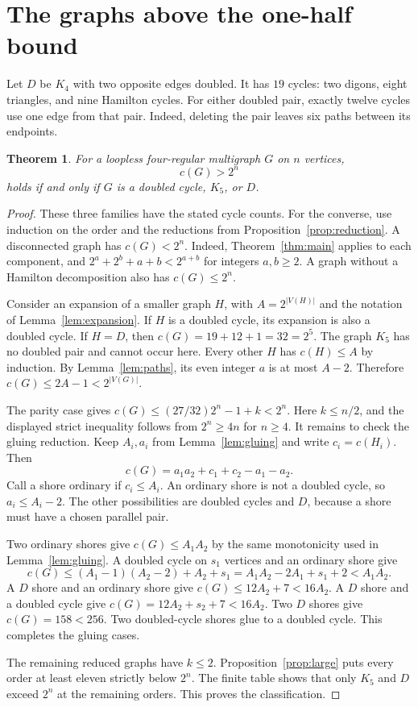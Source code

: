 \documentclass[11pt]{article}
\newtheorem{theorem}{Theorem}
\begin{document}
\section{The graphs above the one-half bound}

Let $D$ be $K_4$ with two opposite edges doubled.
It has $19$ cycles: two digons, eight triangles, and nine Hamilton cycles.
For either doubled pair, exactly twelve cycles use one edge from that pair.
Indeed, deleting the pair leaves six paths between its endpoints.

\begin{theorem}\label{thm:above-half}
For a loopless four-regular multigraph $G$ on $n$ vertices,
\[
 c(G)>2^n
\]
holds if and only if $G$ is a doubled cycle, $K_5$, or $D$.
\end{theorem}

\begin{proof}
These three families have the stated cycle counts.
For the converse, use induction on the order and the reductions from Proposition~\ref{prop:reduction}.
A disconnected graph has $c(G)<2^n$.
Indeed, Theorem~\ref{thm:main} applies to each component, and
$2^a+2^b+a+b<2^{a+b}$ for integers $a,b\ge2$.
A graph without a Hamilton decomposition also has $c(G)\le2^n$.

Consider an expansion of a smaller graph $H$, with $A=2^{|V(H)|}$ and the notation of Lemma~\ref{lem:expansion}.
If $H$ is a doubled cycle, its expansion is also a doubled cycle.
If $H=D$, then $c(G)=19+12+1=32=2^5$.
The graph $K_5$ has no doubled pair and cannot occur here.
Every other $H$ has $c(H)\le A$ by induction.
By Lemma~\ref{lem:paths}, its even integer $a$ is at most $A-2$.
Therefore $c(G)\le2A-1<2^{|V(G)|}$.

The parity case gives $c(G)\le(27/32)2^n-1+k<2^n$.
Here $k\le n/2$, and the displayed strict inequality follows from $2^n\ge4n$ for $n\ge4$.
It remains to check the gluing reduction.
Keep $A_i,a_i$ from Lemma~\ref{lem:gluing} and write $c_i=c(H_i)$.
Then
\[
 c(G)=a_1a_2+c_1+c_2-a_1-a_2.
\]
Call a shore ordinary if $c_i\le A_i$.
An ordinary shore is not a doubled cycle, so $a_i\le A_i-2$.
The other possibilities are doubled cycles and $D$, because a shore must have a chosen parallel pair.

Two ordinary shores give $c(G)\le A_1A_2$ by the same monotonicity used in Lemma~\ref{lem:gluing}.
A doubled cycle on $s_1$ vertices and an ordinary shore give
\[
 c(G)\le(A_1-1)(A_2-2)+A_2+s_1
       =A_1A_2-2A_1+s_1+2<A_1A_2.
\]
A $D$ shore and an ordinary shore give $c(G)\le12A_2+7<16A_2$.
A $D$ shore and a doubled cycle give $c(G)=12A_2+s_2+7<16A_2$.
Two $D$ shores give $c(G)=158<256$.
Two doubled-cycle shores glue to a doubled cycle.
This completes the gluing cases.

The remaining reduced graphs have $k\le2$.
Proposition~\ref{prop:large} puts every order at least eleven strictly below $2^n$.
The finite table shows that only $K_5$ and $D$ exceed $2^n$ at the remaining orders.
This proves the classification.
\end{proof}
\end{document}
